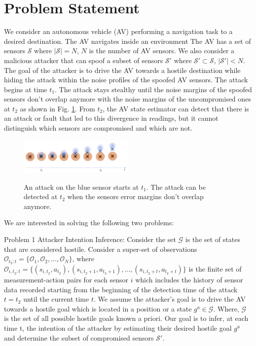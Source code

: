 \documentclass[conference]{IEEEtran}
\begin{document}
\section{Problem Statement}\label{sec:problem}
We consider an autonomous vehicle (AV) performing a navigation task to a desired destination.  The AV navigates inside an environment The AV has a set of sensors $\mathcal{S}$ where $|\mathcal{S}|=N$, $N$ is the number of AV sensors. We also consider a malicious attacker that can spoof a subset of sensors $\mathcal{S'}$ where $\mathcal{S'} \subset \mathcal{S}$, $|\mathcal{S'}| < N$. The goal of the attacker is to drive the AV towards a hostile destination while hiding the attack within the noise profiles of the spoofed AV sensors. The attack begins at time $t_1$. The attack stays stealthy until the noise margins of the spoofed sensors don't overlap anymore with the noise margins of the uncompromised ones at $t_2$ as shown in Fig. \ref{fig:sensor_spoofing}. From $t_2$, the AV state estimator can detect that there is an attack or fault that led to this divergence in readings, but it cannot distinguish which sensors are compromised and which are not.
\begin{figure}[h]
\caption{An attack on the blue sensor starts at $t_1$. The attack can be detected at $t_2$ when the sensors error margins don't overlap anymore.}
\centering
\includegraphics[width=0.5\textwidth]{sensor_spoofing}
 \label{fig:sensor_spoofing}
\end{figure}
We are interested in solving the following two problems:

Problem 1 Attacker Intention Inference: Consider the set $\mathcal{G}$ is the set of states that are considered hostile. Consider a super-set of observations $\mathcal{O}_{t_2:t} = \{\mathcal{O}_1, \mathcal{O}_2, ..., \mathcal{O}_N\}$, where $\mathcal{O}_{i,t_2:t} = \{(s_{i,t_2}, a_{t_2}), (s_{i,t_2+1}, a_{t_2+1}), ..., (s_{i,t_2+t}, a_{t_2+t})\}$ is the finite set of measurement-action pairs for each sensor $i$ which includes the history of sensor data recorded starting from the beginning of the detection time of the attack $t = t_2$ until the current time $t$. We assume the attacker's goal is to drive the AV towards a hostile goal which is located in a position or a state $g^a \in \mathcal{G}$. Where, $\mathcal{G}$ is the set of all possible hostile goals known a priori. Our goal is to infer, at each time t, the intention of the attacker by estimating their desired hostile goal $g^a$ and determine the subset of compromised sensors $\mathcal{S'}$.
\end{document}
